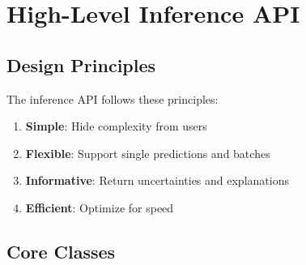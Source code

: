 \documentclass[12pt,a4paper,oneside]{report}
\begin{document}
\section{High-Level Inference API}

\subsection{Design Principles}

The inference API follows these principles:
\begin{enumerate}
    \item \textbf{Simple}: Hide complexity from users
    \item \textbf{Flexible}: Support single predictions and batches
    \item \textbf{Informative}: Return uncertainties and explanations
    \item \textbf{Efficient}: Optimize for speed
\end{enumerate}

\subsection{Core Classes}
\end{document}
